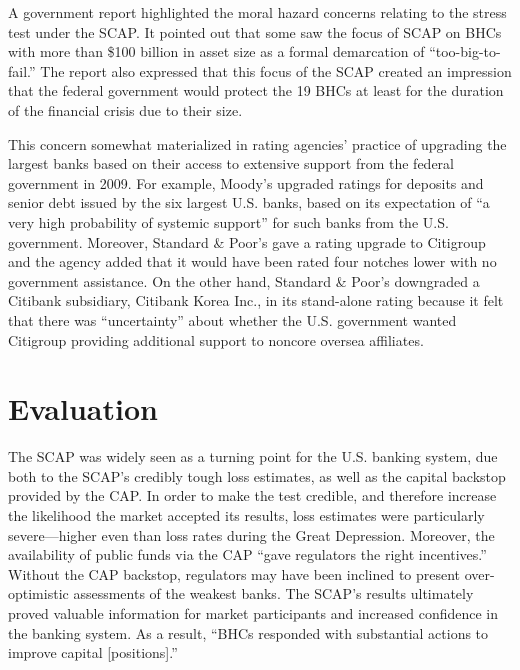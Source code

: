 \documentclass[justified, nobib]{tufte-handout2}
\begin{document}
A government report highlighted the moral hazard concerns relating to
the stress test under the SCAP. It pointed out that some saw the focus
of SCAP on BHCs with more than \$100 billion in asset size as a formal
demarcation of ``too-big-to-fail.'' The report also expressed that this
focus of the SCAP created an impression that the federal government
would protect the 19 BHCs at least for the duration of the financial
crisis due to their size.\citep{OFS}

This concern somewhat materialized in rating agencies' practice of
upgrading the largest banks based on their access to extensive support
from the federal government in 2009. For example, Moody's upgraded
ratings for deposits and senior debt issued by the six largest U.S.
banks, based on its expectation of ``a very high probability of systemic
support'' for such banks from the U.S. government. Moreover, Standard \&
Poor's gave a rating upgrade to Citigroup and the agency added that it
would have been rated four notches lower with no government assistance.
On the other hand, Standard \& Poor's downgraded a Citibank subsidiary,
Citibank Korea Inc., in its stand-alone rating because it felt that
there was ``uncertainty'' about whether the U.S. government wanted
Citigroup providing additional support to noncore oversea affiliates.\citep{OFS}

\section{Evaluation}

The SCAP was widely seen as a turning point for the U.S. banking system,
due both to the SCAP's credibly tough loss estimates, as well as the
capital backstop provided by the CAP. In order to make the test credible,
and therefore increase the likelihood the market accepted its results,
loss estimates were particularly severe---higher even than loss rates
during the Great Depression. Moreover, the availability of public funds
via the CAP ``gave regulators the right incentives.''\citep{Bernanke}
Without the CAP backstop, regulators may have been inclined to present
over-optimistic assessments of the weakest banks. The SCAP's results ultimately proved valuable information for market participants and increased confidence in the banking system. As a result, ``BHCs responded with substantial actions to improve capital [positions].''\citep{Hirtle}


\end{document}
